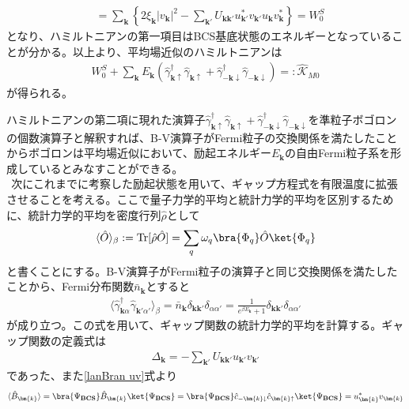 \documentclass[dvipdfmx, 11pt, a4paper]{jsarticle}
\numberwithin{equation}{section}
\theoremstyle{definition}
\begin{document}
\begin{derivationBox}
\begin{align}
            &= \sum_{\bm{k}} \left\{ 2\xi_{\bm{k}} |v_{\bm{k}}|^2  -\sum_{\bm{k}'} U_{\bm{k\bm{k}'}} u_{\bm{k}'}^*v_{\bm{k}'}  u_{\bm{k}}v_{\bm{k}}^* \right\} = W_0^S
        \end{align}
        となり、ハミルトニアンの第一項目はBCS基底状態のエネルギーとなっていることが分かる。以上より、平均場近似のハミルトニアンは
        \begin{align}
            W_0^S+ \sum_{\bm{k}}E_{\bm{k}}(\hat{\gamma}_{\bm{k}\uparrow}^\dagger \hat{\gamma}_{\bm{k}\uparrow} + \hat{\gamma}_{-\bm{k}\downarrow}^\dagger\hat{\gamma}_{-\bm{k}\downarrow}) =: \hat{\mathscr{K}}_{M0}
        \end{align}
        が得られる。
    \end{derivationBox}
    ハミルトニアンの第二項に現れた演算子$\hat{\gamma}_{\bm{k}\uparrow}^\dagger \hat{\gamma}_{\bm{k}\uparrow} + \hat{\gamma}_{-\bm{k}\downarrow}^\dagger\hat{\gamma}_{-\bm{k}\downarrow}$を準粒子ボゴロンの個数演算子と解釈すれば、B-V演算子がFermi粒子の交換関係を満たしたことからボゴロンは平均場近似において、励起エネルギー$E_{\bm{k}}$の自由Fermi粒子系を形成しているとみなすことができる。\\
    $\ \ $次にこれまでに考察した励起状態を用いて、ギャップ方程式を有限温度に拡張させることを考える。ここで量子力学的平均と統計力学的平均を区別するために、統計力学的平均を密度行列$\hat{\rho}$として
    \begin{align}
        \langle \hat{O} \rangle_{\beta} := \text{Tr}[\hat{\rho} \hat{O}] = \sum_{q} \omega_q \bra{\Phi_q} \hat{O} \ket{\Phi_q}
    \end{align}
    と書くことにする。B-V演算子がFermi粒子の演算子と同じ交換関係を満たしたことから、Fermi分布関数$\bar{n}_{\bm{k}}$とすると
    \begin{align}
        \langle \hat{\gamma}_{\bm{k}\alpha} ^\dagger \hat{\gamma}_{\bm{k}'\alpha'} \rangle_{\beta} = \bar{n}_{\bm{k}} \delta_{\bm{k}\bm{k}'}\delta_{\alpha \alpha'} = \frac{1}{e^{\beta E_{\bm{k}}}+1} \delta_{\bm{k}\bm{k}'}\delta_{\alpha \alpha'}
    \end{align}
    が成り立つ。この式を用いて、ギャップ関数の統計力学的平均を計算する。ギャップ関数の定義式は
    \begin{align}
        \Delta_{\bm{k}} = - \sum_{\bm{k}'} U_{\bm{k}\bm{k}'} u_{\bm{k}'}v_{\bm{k}'}
    \end{align}
    であった、また\eqref{lanBran uv}式より
    \begin{align}
        \langle \hat{B}_{\bm{k}} \rangle = \bra{\Psi_{\textbf{BCS}}} \hat{B}_{\bm{k}} \ket{\Psi_{\textbf{BCS}}} = \bra{\Psi_{\textbf{BCS}}} \hat{c}_{-\bm{k}\downarrow} \hat{c}_{\bm{k}\uparrow} \ket{\Psi_{\textbf{BCS}}} = u_{\bm{k}}^* v_{\bm{k}} 
    \end{align}
\end{document}
